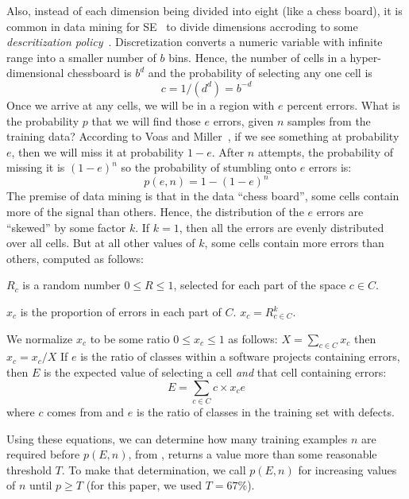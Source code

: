 Also,
instead of each dimension being divided into eight (like a chess board), it is common in data mining for SE~\cite{Menzies2014a}
to divide dimensions accroding to some {\em descritization policy}~\cite{lust08}.
Discretization converts a numeric variable with infinite range into a smaller number of  $b$ bins. Hence, the number of cells in a
hyper-dimensional chessboard is $b^d$ and the probability of selecting any one cell is
\begin{equation}\label{eq:c}c=1/(d^d)=b^{-d}\end{equation}
Once we arrive at any cells, we will be in a region with $e$ percent errors.
What  is the probability $p$ that we will find those $e$ errors, given $n$ samples from the training data?
According to Voas and Miller~\cite{voas1995software},
if we see something at probability $e$, then we will miss it at probability $1-e$.
After $n$ attempts, the probability of missing it is $(1-e)^n$ so the probability of stumbling onto $e$ errors is:
\begin{equation}\label{eq:p}
p(e,n) = 1-(1-e)^n
\end{equation}
The premise of data mining is that in the data ``chess board'', some cells contain more of the signal than others. Hence, the 
distribution of the $e$ errors are ``skewed'' by some factor $k$. If $k=1$, then all the errors are evenly distributed over all cells.
But at all other values of $k$, some cells contain more errors than others, computed as follows:
    \bi
  \item $R_c$ is a random number $0\le R \le 1$, selected for each part of the space $c\in C$.
  \item $x_c$ is the proportion of errors in each part of $C$. \mbox{$x_c =  R_{c\in C}^k$}.
  \item We normalize $x_c$ to be some ratio $0 \le x_c \le 1$ as follows: $X= \sum_{c\in C} x_c$ then $x_c = x_c/X$
    \ei
    If  $e$ is the ratio of classes within a software projects containing errors, then $E$ 
    is the expected value  of selecting a cell {\em and} that cell containing errors:
    \begin{equation}\label{eq:E}
     E   = \sum_{c\in C}c \times x_ce
    \end{equation}
    where $c$ comes from  and $e$ is the ratio of classes in the training set with defects.


Using these equations, we can determine how many
training examples $n$ are required before $p(E,n)$, from 
, returns a value more than some reasonable
threshold $T$.  To make that determination, we call
$p(E,n)$ for increasing values of $n$ until $p \ge
T$ (for this paper, we used $T = 67\%$).


